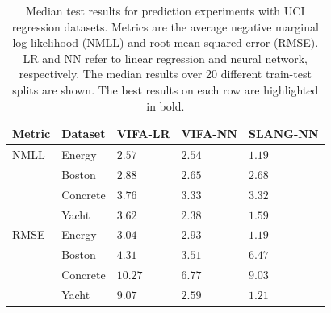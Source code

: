 \documentclass[msc,deptreport.inf]{infthesis} %
\begin{document}
\begin{table}[h!]
	\begin{center}
		\begin{tabular}{@{} lllll @{}} 
 			\toprule
 			Metric & Dataset & VIFA-LR & VIFA-NN & SLANG-NN \\
 			\midrule
			NMLL 	& Energy 		& $2.57$ 					& $2.54$ 					& $\mathbf{1.19}$ \\ 	
			   		& Boston   	& $2.88$	 				& $\mathbf{2.65}$ 			& $2.68$ \\ 			
			  		& Concrete	& $3.76$ 					& $3.33$ 					& $\mathbf{3.32}$ \\ 			
 					& Yacht    		& $3.62$ 					& $2.38$ 					& $\mathbf{1.59}$ \\
 			\midrule
			RMSE 	& Energy 	 	& $3.04$ 					& $2.93$ 					& $\mathbf{1.19}$ \\ 
					& Boston 	 	& $4.31$ 					& $\mathbf{3.51}$ 			& $6.47$ \\ 
					& Concrete  	& $10.27$ 				& $\mathbf{6.77}$ 			& $9.03$ \\ 
 					& Yacht 		& $9.07$ 					& $2.59$ 					& $\mathbf{1.21}$ \\ 
			\bottomrule
		\end{tabular}
		\caption{Median test results for prediction experiments with UCI regression datasets. Metrics are the average negative marginal log-likelihood (NMLL) and root mean squared error (RMSE). LR and NN refer to linear regression and neural network, respectively. The  median results over 20 different train-test splits are shown. The best results on each row are highlighted in bold.}
		\label{table:neural_nets_uci_median}
	\end{center}
\end{table}
\end{document}
